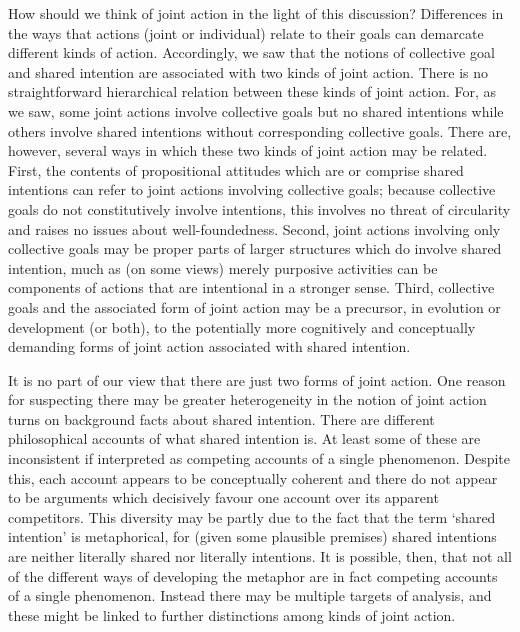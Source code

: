 \documentclass[12pt,a4paper]{extarticle}
\begin{document}
How should we think of joint action in the light of this discussion? 
Differences in the ways that actions (joint or individual) relate to their goals can demarcate different kinds of action.
Accordingly, we saw that the notions of collective goal and shared intention are associated with two kinds of joint action.
There is no straightforward hierarchical relation between these kinds of joint action.  
For, as we saw, some joint actions involve collective goals but no shared intentions while others involve shared intentions without corresponding collective goals.  
There are, however, several ways in which these two kinds of joint action may be related.
First, the contents of propositional attitudes which are or comprise shared intentions can refer to joint actions involving collective goals; because collective goals do not constitutively involve intentions, this involves no threat of circularity and raises no issues about well-foundedness.
Second, joint actions involving only collective goals may be proper parts of larger structures which do involve shared intention, much as (on some views) merely purposive activities can be components of actions that are intentional in a stronger sense.
Third, collective goals and the associated form of joint action may be a precursor, in evolution or development (or both), to the potentially more cognitively and conceptually demanding forms of joint action associated with shared intention.

It is no part of our view that there are just two forms of joint action.  
One reason for suspecting there may be greater heterogeneity in the notion of joint action turns on background facts about shared intention.
There are different philosophical accounts of what shared intention is.  
At least some of these are inconsistent if interpreted as competing accounts of a single phenomenon.
Despite this, each account appears to be conceptually coherent and there  do not appear to be arguments which decisively favour one account over its apparent competitors.
This diversity may be partly due to the fact that the term `shared intention' is metaphorical, for (given some plausible premises) shared intentions are neither literally shared nor literally intentions.  
It is possible, then, that not all of the different ways of developing the metaphor are in fact competing accounts of a single phenomenon.
Instead there may be multiple targets of analysis, and these might be linked to further distinctions among kinds of joint action.
\end{document}
